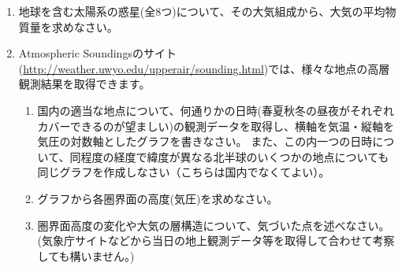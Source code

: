 \documentclass{jsarticle}
\newenvironment{problems}
{
  \renewcommand\labelenumi{\doublebox{\arabic{enumi}}}
  \begin{enumerate}
}{
  \end{enumerate}
  \renewcommand\labelenumi{\arabic{enumi}.}
}
\begin{document}
\begin{problems}
        \begin{enumerate}[(1)]
        \item 文中の空欄(A)〜(H)に当てはまる語句や数値を答えなさい。
        \item 下線部(a)のように、(C)が緯度や年単位・日単位で変動するのは何故か説明しなさい。
        \item 下線部(b)については、エアコン等の冷媒として使われたフロンガスが原因とされますが、実際にはそれ以外の物質も多くあり、いずれも触媒の役割を果たします。
              破壊はオゾンが酸素になることにより起きますが、その化学反応式を答えなさい。
        \item 下線部(c)に関連して、この高度では一般にやけどしないが、なぜか答えなさい。
        \item 下線部(d)について、この層がどのような役割を果たして電波が遠くまで伝わるのか、その理由を述べなさい。\\
        \end{enumerate}

    \item 地球を含む太陽系の惑星(全8つ)について、その大気組成から、大気の平均物質量を求めなさい。\\

    \item Atmospheric Soundingsのサイト(\url{http://weather.uwyo.edu/upperair/sounding.html})では、様々な地点の高層観測結果を取得できます。
        \begin{enumerate}[(1)]
        \item 国内の適当な地点について、何通りかの日時(春夏秋冬の昼夜がそれぞれカバーできるのが望ましい)の観測データを取得し、横軸を気温・縦軸を気圧の対数軸としたグラフを書きなさい。
            また、この内一つの日時について、同程度の経度で緯度が異なる北半球のいくつかの地点についても同じグラフを作成しなさい（こちらは国内でなくてよい）。
        \item グラフから各圏界面の高度(気圧)を求めなさい。
        \item 圏界面高度の変化や大気の層構造について、気づいた点を述べなさい。(気象庁サイトなどから当日の地上観測データ等を取得して合わせて考察しても構いません。)
        \end{enumerate}
\end{problems}
\end{document}

